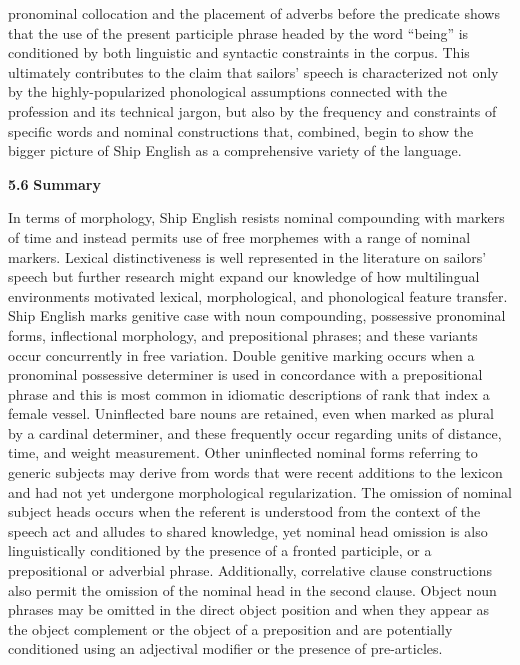 pronominal collocation and the placement of adverbs before the predicate shows that the use of the present participle phrase headed by the word “being” is conditioned by both linguistic and syntactic constraints in the corpus. This ultimately contributes to the claim that sailors’ speech is characterized not only by the highly-popularized phonological assumptions connected with the profession and its technical jargon, but also by the frequency and constraints of specific words and nominal constructions that, combined, begin to show the bigger picture of Ship English as a comprehensive variety of the language.  

\textbf{5.6} \textbf{Summary} 

In terms of morphology, Ship English resists nominal compounding with markers of time and instead permits use of free morphemes with a range of nominal markers. Lexical distinctiveness is well represented in the literature on sailors’ speech but further research might expand our knowledge of how multilingual environments motivated lexical, morphological, and phonological feature transfer. Ship English marks genitive case with noun compounding, possessive pronominal forms, inflectional morphology, and prepositional phrases; and these variants occur concurrently in free variation. Double genitive marking occurs when a pronominal possessive determiner is used in concordance with a prepositional phrase and this is most common in idiomatic descriptions of rank that index a female vessel. Uninflected bare nouns are retained, even when marked as plural by a cardinal determiner, and these frequently occur regarding units of distance, time, and weight measurement. Other uninflected nominal forms referring to generic subjects may derive from words that were recent additions to the lexicon and had not yet undergone morphological regularization. The omission of nominal subject heads occurs when the referent is understood from the context of the speech act and alludes to shared knowledge, yet nominal head omission is also linguistically conditioned by the presence of a fronted participle, or a prepositional or adverbial phrase. Additionally, correlative clause constructions also permit the omission of the nominal head in the second clause. Object noun phrases may be omitted in the direct object position and when they appear as the object complement or the object of a preposition and are potentially conditioned using an adjectival modifier or the presence of pre-articles.

